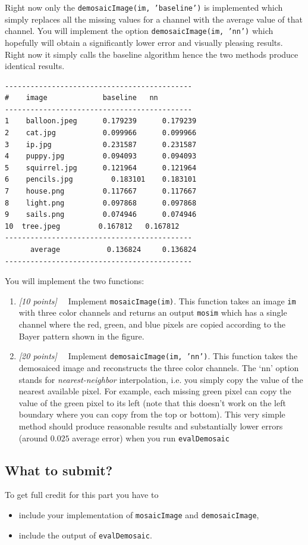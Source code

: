 \documentclass[10pt,letterpaper]{article}
\newcommand{\cmd}[1] {{\color{blue}\texttt{#1}}}
\newcommand{\points}[1]{{\color{mygreen}\emph{[#1]\ \ }}}
\begin{document}
Right now only the \cmd{demosaicImage(im, 'baseline')} is implemented which simply replaces all the missing values for a channel with the average value of that channel. You will implement the option \cmd{demosaicImage(im, 'nn')} which hopefully will obtain a significantly lower error and visually pleasing results. Right now it simply calls the baseline algorithm hence the two methods produce identical results.

\begin{verbatim}
--------------------------------------------
# 	 image             baseline   nn
--------------------------------------------
1 	 balloon.jpeg      0.179239 	 0.179239 
2 	 cat.jpg           0.099966 	 0.099966 
3 	 ip.jpg            0.231587 	 0.231587 
4 	 puppy.jpg         0.094093 	 0.094093 
5 	 squirrel.jpg      0.121964 	 0.121964 
6 	 pencils.jpg 	     0.183101 	 0.183101 
7 	 house.png         0.117667 	 0.117667 
8 	 light.png         0.097868 	 0.097868 
9 	 sails.png         0.074946 	 0.074946 
10  tree.jpeg         0.167812 	 0.167812 
--------------------------------------------
 	  average           0.136824 	 0.136824 
--------------------------------------------
\end{verbatim}
You will implement the two functions:
\begin{enumerate}
\item \points{10 points} Implement \cmd{mosaicImage(im)}. This function takes an image \cmd{im} with three color channels and returns an output \cmd{mosim} which has a single channel where the red, green, and blue pixels are copied according to the Bayer pattern shown in the figure. 
\item \points{20 points} Implement \cmd{demosaicImage(im, 'nn')}. This function takes the demosaiced image and reconstructs the three color channels. The `nn' option stands for \emph{nearest-neighbor} interpolation, i.e. you simply copy the value of the nearest available pixel. For example, each missing green pixel can copy the value  of the green pixel to its left (note that this doesn't work on the left boundary where you can copy from the top or bottom). This very simple method should produce reasonable results and substantially lower errors (around $0.025$ average error) when you run \cmd{evalDemosaic}
\end{enumerate}

\subsection{What to submit?}
To get full credit for this part you have to 
\begin{itemize}
\item include your implementation of \cmd{mosaicImage} and \cmd{demosaicImage},
\item include the output of \cmd{evalDemosaic}.
\end{itemize}
\end{document}
